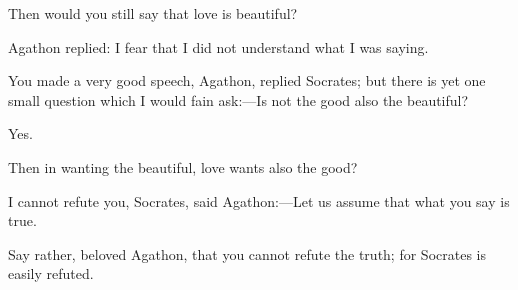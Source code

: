 \documentclass[11pt,letter]{article}
\begin{document}
\par  Then would you still say that love is beautiful?

\par  Agathon replied: I fear that I did not understand what I was saying.

\par  You made a very good speech, Agathon, replied Socrates; but there is yet one small question which I would fain ask:—Is not the good also the beautiful?

\par  Yes.

\par  Then in wanting the beautiful, love wants also the good?

\par  I cannot refute you, Socrates, said Agathon:—Let us assume that what you say is true.

\par  Say rather, beloved Agathon, that you cannot refute the truth; for Socrates is easily refuted.
\end{document}
